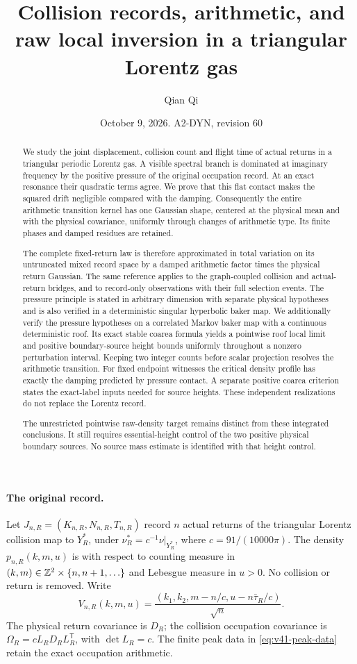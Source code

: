 \documentclass[11pt,reqno]{amsart}
\title[Collision records and raw local inversion]{Collision records, arithmetic, and raw local inversion in a triangular Lorentz gas}
\author{Qian Qi}
\date{October 9, 2026. A2-DYN, revision 60}
\numberwithin{equation}{section}
\theoremstyle{definition}\newtheorem{definition}[theorem]{Definition}
\theoremstyle{remark}\newtheorem{remark}[theorem]{Remark}
\begin{document}
\raggedbottom
\begin{abstract}
We study the joint displacement, collision count and flight time of
actual returns in a triangular periodic Lorentz gas. A visible spectral
branch is dominated at imaginary frequency by the positive pressure
of the original occupation record. At an exact resonance their
quadratic terms agree. We prove that this flat contact makes the
squared drift negligible compared with the damping. Consequently the
entire arithmetic transition kernel has one Gaussian shape, centered
at the physical mean and with the physical covariance, uniformly
through changes of arithmetic type. Its finite phases and damped
residues are retained.

The complete fixed-return law is therefore approximated in total
variation on its untruncated mixed record space by a damped arithmetic
factor times the physical return Gaussian. The same reference applies
to the graph-coupled collision and actual-return bridges, and to
record-only observations with their full selection events. The pressure
principle is stated in arbitrary dimension with separate physical
hypotheses and is also verified in a deterministic singular hyperbolic
baker map. We additionally verify the pressure hypotheses on a
correlated Markov baker map with a continuous deterministic roof. Its
exact stable coarea formula yields a pointwise roof local limit and
positive boundary-source height bounds uniformly throughout a nonzero
perturbation interval. Keeping two integer counts before scalar projection
resolves the arithmetic transition. For fixed endpoint witnesses the
critical density profile has exactly the damping predicted by pressure
contact. A separate positive coarea criterion states the exact-label
inputs needed for source heights. These independent realizations
do not replace the Lorentz record.

The unrestricted pointwise raw-density target remains distinct from
these integrated conclusions. It still requires essential-height
control of the two positive physical boundary sources. No source
mass estimate is identified with that height control.
\end{abstract}
\maketitle

\paragraph{The original record.}
Let $J_{n,R}=(K_{n,R},N_{n,R},T_{n,R})$ record $n$ actual returns
of the triangular Lorentz collision map to $Y_R^*$, under
$\nu_R^*=c^{-1}\nu|_{Y_R^*}$, where $c=91/(10000\pi)$.
The density $p_{n,R}(k,m,u)$ is with respect to counting measure in
$(k,m)\in\mathbb Z^2\times\{n,n+1,\ldots\}$ and Lebesgue measure in $u>0$.
No collision or return is removed. Write
\[
 V_{n,R}(k,m,u)=
       \frac{(k_1,k_2,m-n/c,u-n\bar\tau_R/c)}{\sqrt n}.
\]
The physical return covariance is $D_R$; the collision occupation
covariance is $\Omega_R=cL_RD_RL_R^{\mathsf T}$, with
$\det L_R=c$. The finite peak data in
\eqref{eq:v41-peak-data} retain the exact occupation arithmetic.
\end{document}
